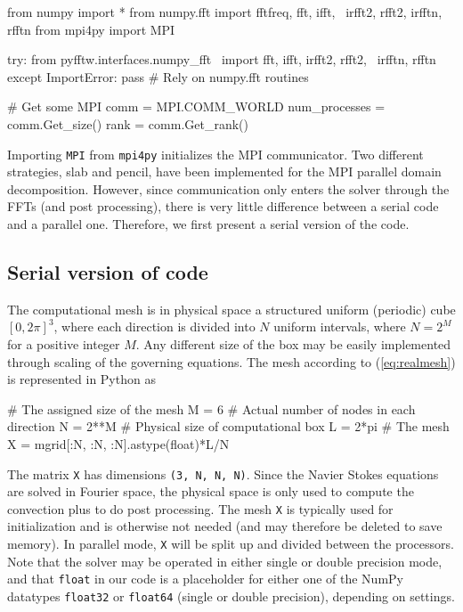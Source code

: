 \documentclass[final,3p,times,twocolumn]{elsarticle}
\newcommand{\inpyth}{\lstinline[style=inlinestyle]}
\begin{document}
\begin{python}
from numpy import *
from numpy.fft import fftfreq, fft, ifft, \
  irfft2, rfft2, irfftn, rfftn
from mpi4py import MPI

try:
    from pyfftw.interfaces.numpy_fft \ 
    import fft, ifft, irfft2, rfft2, \
    irfftn, rfftn
except ImportError:
    pass # Rely on numpy.fft routines

# Get some MPI     
comm = MPI.COMM_WORLD
num_processes = comm.Get_size()
rank = comm.Get_rank()         
\end{python}
Importing \texttt{MPI} from \texttt{mpi4py} initializes the MPI communicator. 
Two different strategies, slab and pencil, have been implemented for the MPI 
parallel domain decomposition. However, since communication only enters the 
solver through the FFTs (and post processing), there is very little difference 
between a serial code and a parallel one. Therefore, we first present a serial 
version of the code.

\subsection{Serial version of code}
The computational mesh is in physical space a structured uniform (periodic) 
cube $[0, 2\pi]^3$, where each direction is divided into $N$ uniform intervals, 
where $N=2^M$ for a positive integer $M$. Any different size of the box may be 
easily implemented through scaling of the governing equations. The mesh 
according to (\ref{eq:realmesh}) is represented in Python as

\begin{python}
# The assigned size of the mesh
M = 6       
# Actual number of nodes in each direction
N = 2**M    
# Physical size of computational box
L = 2*pi    
# The mesh
X = mgrid[:N, :N, :N].astype(float)*L/N
\end{python}
The matrix \inpyth{X} has dimensions \inpyth{(3, N, N, N)}. Since the Navier 
Stokes equations are solved in Fourier space, the physical space is only used 
to compute the convection plus to do post processing. The mesh \inpyth{X} is 
typically used for initialization and is otherwise not needed (and may 
therefore be deleted to save memory). In parallel mode, \inpyth{X} will be 
split up and divided between the processors.  Note that the solver may be 
operated in either single or double precision mode, and that \inpyth{float} in 
our code is a placeholder for either one of the NumPy datatypes 
\inpyth{float32} or \inpyth{float64} (single or double precision), depending on 
settings.
\end{document}
